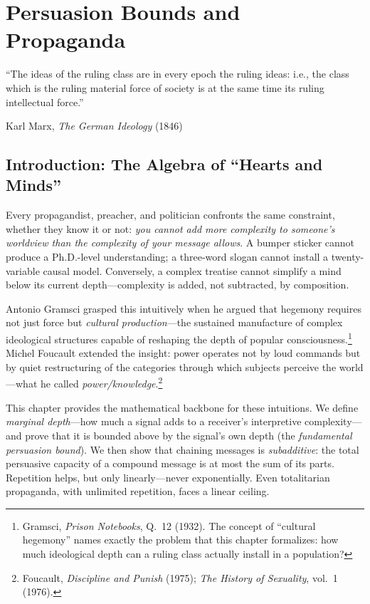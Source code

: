 \chapter{Persuasion Bounds and Propaganda}
\label{ch:persuasion}

\epigraph{%
  ``The ideas of the ruling class are in every epoch the ruling ideas:
  i.e., the class which is the ruling material force of society is at the
  same time its ruling intellectual force.''}%
  {Karl Marx, \textit{The German Ideology} (1846)}

\section{Introduction: The Algebra of ``Hearts and Minds''}
\label{sec:pers-intro}

Every propagandist, preacher, and politician confronts the same constraint,
whether they know it or not: \emph{you cannot add more complexity to someone's
worldview than the complexity of your message allows}.  A bumper sticker
cannot produce a Ph.D.-level understanding; a three-word slogan cannot
install a twenty-variable causal model.  Conversely, a complex treatise
cannot simplify a mind below its current depth---complexity is added, not
subtracted, by composition.

Antonio Gramsci grasped this intuitively when he argued that hegemony requires
not just force but \emph{cultural production}---the sustained manufacture of
complex ideological structures capable of reshaping the depth of popular
consciousness.\footnote{Gramsci, \textit{Prison Notebooks}, Q.~12 (1932).
The concept of ``cultural hegemony'' names exactly the problem that this
chapter formalizes: how much ideological depth can a ruling class actually
install in a population?}  Michel Foucault extended the insight: power
operates not by loud commands but by quiet restructuring of the categories
through which subjects perceive the world---what he called
\emph{power/knowledge}.\footnote{Foucault, \textit{Discipline and Punish}
(1975); \textit{The History of Sexuality}, vol.~1 (1976).}

This chapter provides the mathematical backbone for these intuitions.  We
define \emph{marginal depth}---how much a signal adds to a receiver's
interpretive complexity---and prove that it is bounded above by the signal's
own depth (the \emph{fundamental persuasion bound}).  We then show that
chaining messages is \emph{subadditive}: the total persuasive capacity of
a compound message is at most the sum of its parts.  Repetition helps, but
only linearly---never exponentially.  Even totalitarian propaganda, with
unlimited repetition, faces a linear ceiling.

